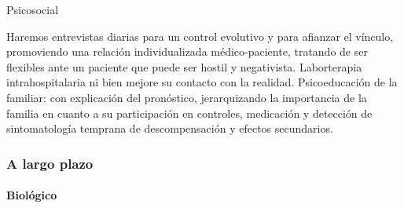 Psicosocial

Haremos entrevistas diarias para un control evolutivo y para afianzar el vínculo, promoviendo una relación individualizada médico-paciente, tratando de ser flexibles ante un paciente que puede ser hostil y negativista. Laborterapia intrahospitalaria ni bien mejore su contacto con la realidad. Psicoeducación de la familiar: con explicación del pronóstico, jerarquizando la importancia de la familia en cuanto a su participación en controles, medicación y detección de sintomatología temprana de descompensación y efectos secundarios.

\subsubsection*{A largo plazo}
\paragraph{Biológico}

\printbibliography
